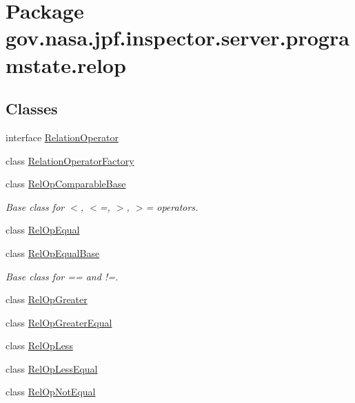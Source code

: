 \hypertarget{namespacegov_1_1nasa_1_1jpf_1_1inspector_1_1server_1_1programstate_1_1relop}{}\section{Package gov.\+nasa.\+jpf.\+inspector.\+server.\+programstate.\+relop}
\label{namespacegov_1_1nasa_1_1jpf_1_1inspector_1_1server_1_1programstate_1_1relop}
\subsection*{Classes}
\begin{DoxyCompactItemize}
\item 
interface \hyperlink{interfacegov_1_1nasa_1_1jpf_1_1inspector_1_1server_1_1programstate_1_1relop_1_1_relation_operator}{Relation\+Operator}
\item 
class \hyperlink{classgov_1_1nasa_1_1jpf_1_1inspector_1_1server_1_1programstate_1_1relop_1_1_relation_operator_factory}{Relation\+Operator\+Factory}
\item 
class \hyperlink{classgov_1_1nasa_1_1jpf_1_1inspector_1_1server_1_1programstate_1_1relop_1_1_rel_op_comparable_base}{Rel\+Op\+Comparable\+Base}
\begin{DoxyCompactList}\small\item\em Base class for $<$, $<$=, $>$, $>$= operators. \end{DoxyCompactList}\item 
class \hyperlink{classgov_1_1nasa_1_1jpf_1_1inspector_1_1server_1_1programstate_1_1relop_1_1_rel_op_equal}{Rel\+Op\+Equal}
\item 
class \hyperlink{classgov_1_1nasa_1_1jpf_1_1inspector_1_1server_1_1programstate_1_1relop_1_1_rel_op_equal_base}{Rel\+Op\+Equal\+Base}
\begin{DoxyCompactList}\small\item\em Base class for == and !=. \end{DoxyCompactList}\item 
class \hyperlink{classgov_1_1nasa_1_1jpf_1_1inspector_1_1server_1_1programstate_1_1relop_1_1_rel_op_greater}{Rel\+Op\+Greater}
\item 
class \hyperlink{classgov_1_1nasa_1_1jpf_1_1inspector_1_1server_1_1programstate_1_1relop_1_1_rel_op_greater_equal}{Rel\+Op\+Greater\+Equal}
\item 
class \hyperlink{classgov_1_1nasa_1_1jpf_1_1inspector_1_1server_1_1programstate_1_1relop_1_1_rel_op_less}{Rel\+Op\+Less}
\item 
class \hyperlink{classgov_1_1nasa_1_1jpf_1_1inspector_1_1server_1_1programstate_1_1relop_1_1_rel_op_less_equal}{Rel\+Op\+Less\+Equal}
\item 
class \hyperlink{classgov_1_1nasa_1_1jpf_1_1inspector_1_1server_1_1programstate_1_1relop_1_1_rel_op_not_equal}{Rel\+Op\+Not\+Equal}
\end{DoxyCompactItemize}

